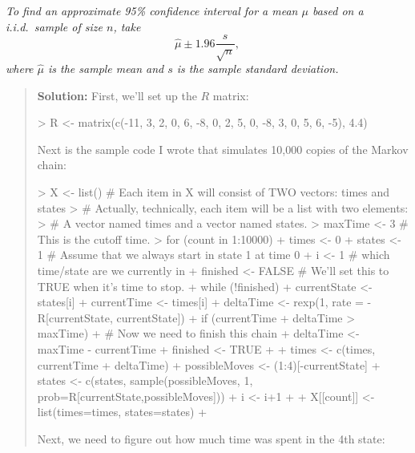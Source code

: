 \documentclass{article}
\begin{document}
\begin{enumerate}
\begin{enumerate}
    \vspace{1ex}
    {\em To find an approximate 95\% confidence interval for a mean $\mu$ based
    on a i.i.d.~sample of size $n$, take
    \[
    \hat\mu \pm 1.96 \frac{s}{\sqrt{n}},
    \]
    where $\hat\mu$ is the sample mean and $s$ is the sample standard deviation.
    }
  
    \begin{quotation}{\bf Solution:}
    First, we'll set up the $R$ matrix:
\begin{Schunk}
\begin{Sinput}
> R <- matrix(c(-11, 3, 2, 0, 6, -8, 0, 2, 5, 0, -8, 3, 0, 5, 6, -5), 4.4)
\end{Sinput}
\end{Schunk}
   Next is the sample code I wrote that simulates 10,000 copies of the Markov chain:
\begin{Schunk}
\begin{Sinput}
> X <- list()  # Each item in X will consist of TWO vectors:  times and states
>              # Actually, technically, each item will be a list with two elements:
>              # A vector named times and a vector named states.
> maxTime <- 3 # This is the cutoff time.
> for (count in 1:10000) {
+   times <- 0
+   states <- 1 # Assume that we always start in state 1 at time 0
+   i <- 1 # which time/state are we currently in
+   finished <- FALSE # We'll set this to TRUE when it's time to stop.
+   while (!finished) {
+     currentState <- states[i]
+     currentTime <- times[i]
+     deltaTime <- rexp(1, rate = -R[currentState, currentState])
+     if (currentTime + deltaTime > maxTime) {
+       # Now we need to finish this chain
+       deltaTime <- maxTime - currentTime
+       finished <- TRUE
+     }
+     times <- c(times, currentTime + deltaTime)
+     possibleMoves <- (1:4)[-currentState]
+     states <- c(states, sample(possibleMoves, 1, prob=R[currentState,possibleMoves]))
+     i <- i+1
+   }
+   X[[count]] <- list(times=times, states=states)
+ }
\end{Sinput}
\end{Schunk}
   Next, we need to figure out how much time was spent in the 4th state:
\begin{Schunk}
\end{Schunk}

\end{quotation}
\end{enumerate}
\end{enumerate}
\end{document}

